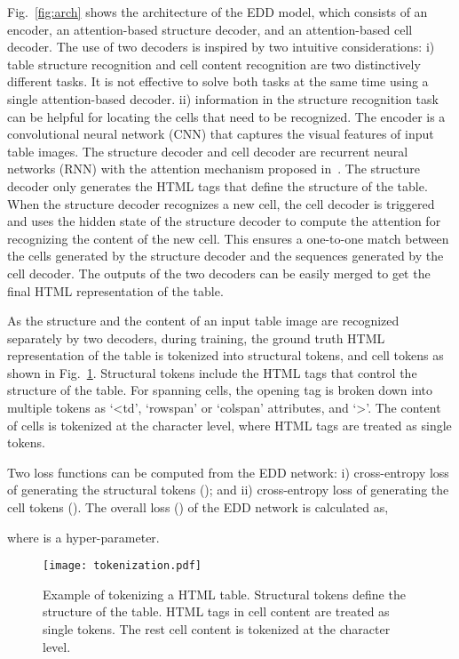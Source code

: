 \documentclass[conference]{IEEEtran}
\begin{document}
Fig.~\ref{fig:arch} shows the architecture of the EDD model, which consists of
an encoder, an attention-based structure decoder, and an attention-based cell
decoder. The use of two decoders is inspired by two intuitive considerations:
i) table structure recognition and cell content recognition are two
distinctively different tasks. It is not effective to solve both tasks at the
same time using a single attention-based decoder. ii) information in the
structure recognition task can be helpful for locating the cells that need to be
recognized. The encoder is a convolutional neural network (CNN) that captures
the visual features of input table images. The structure decoder and cell
decoder are recurrent neural networks (RNN) with the attention mechanism
proposed in~\cite{xu2015show}. The structure decoder only generates the HTML
tags that define the structure of the table. When the structure decoder
recognizes a new cell, the cell decoder is triggered and uses the hidden state
of the structure decoder to compute the attention for recognizing the content of
the new cell. This ensures a one-to-one match between the cells generated by the
structure decoder and the sequences generated by the cell decoder. The outputs
of the two decoders can be easily merged to get the final HTML representation of
the table.

As the structure and the content of an input table image are recognized
separately by two decoders, during training, the ground truth HTML
representation of the table is tokenized into structural tokens, and cell tokens
as shown in Fig.~\ref{fig:tokenization}. Structural tokens include the HTML
tags that control the structure of the table. For spanning cells, the opening
tag is broken down into multiple tokens as `\textless td', `rowspan' or
`colspan' attributes, and `\textgreater'. The content of cells is tokenized at
the character level, where HTML tags are treated as single tokens.

Two loss functions can be computed from the EDD network: i) cross-entropy loss
of generating the structural tokens (); and ii) cross-entropy loss of
generating the cell tokens (). The overall loss () of the EDD network is
calculated as,

where  is a hyper-parameter.

\begin{figure}[!ht]
\begin{center}
  \texttt{[image: tokenization.pdf]}
\end{center}
  \caption{Example of tokenizing a HTML table. Structural tokens define the
  structure of the table. HTML tags in cell content are treated as single
  tokens. The rest cell content is tokenized at the character level.}
\label{fig:tokenization}
\end{figure}
\end{document}
